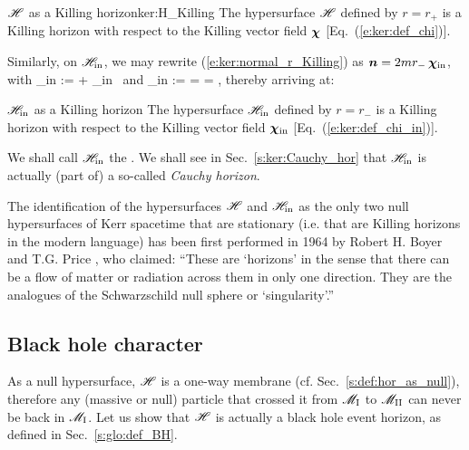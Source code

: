 \begin{tprop}{$\mathscr{H}$ as a Killing horizon}{ker:H_Killing}
The hypersurface $\mathscr{H}$ defined by $r=r_+$ is a Killing horizon with respect to the Killing vector field $\bm{\chi}$
[Eq.~(\ref{e:ker:def_chi})].
\end{tprop}

Similarly, on $\mathscr{H}_{\rm in}$, we may rewrite (\ref{e:ker:normal_r_Killing})
as $\bm{n} = 2 m r_- \, \bm{\chi}_{\rm in}$, with
\be \label{e:ker:def_chi_in}
    \w{\chi}_{\rm in} := \w{\xi} + \Omega_{\rm in} \, \w{\eta}
\ee
and
\be \label{e:ker:def_Omega_in}
    \Omega_{\rm in} :=  = 
        =  ,
\ee
thereby arriving at:
\begin{tprop}{$\mathscr{H}_{\rm in}$ as a Killing horizon}{}
The hypersurface $\mathscr{H}_{\rm in}$ defined by $r=r_-$ is a Killing horizon with respect to the Killing vector field $\bm{\chi}_{\rm in}$
[Eq.~(\ref{e:ker:def_chi_in})].
\end{tprop}
We shall call $\mathscr{H}_{\rm in}$ the . We shall see in Sec.~\ref{s:ker:Cauchy_hor} that $\mathscr{H}_{\rm in}$
is actually (part of) a so-called \emph{Cauchy horizon}.

\begin{hist}
The identification of the hypersurfaces $\mathscr{H}$ and $\mathscr{H}_{\rm in}$
as the only two null hypersurfaces of Kerr spacetime that are stationary
(i.e. that are Killing horizons in the modern language) has been first performed in
1964 by Robert H. Boyer
and T.G. Price \cite{BoyerP65}, who claimed: ``These are `horizons'
in the sense that there can be a flow of matter or radiation across them in only one direction.
They are the analogues of the Schwarzschild null sphere or `singularity'.''
\end{hist}

\subsection{Black hole character} \label{s:ker:event_hor}

As a null hypersurface, $\mathscr{H}$ is a one-way membrane (cf. Sec.~\ref{s:def:hor_as_null}),
therefore any (massive or null) particle that crossed it from $\mathscr{M}_{\rm I}$ to
$\mathscr{M}_{\rm II}$ can never be back in $\mathscr{M}_{\rm I}$. Let us show that $\mathscr{H}$
is actually a black hole event horizon, as defined in Sec.~\ref{s:glo:def_BH}.

